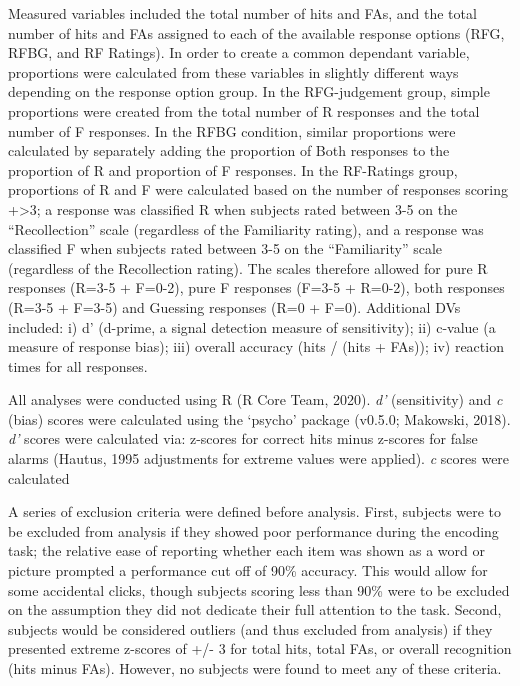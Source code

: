 \documentclass[
  11pt,
]{article}
\begin{document}
Measured variables included the total number of hits and FAs, and the
total number of hits and FAs assigned to each of the available response
options (RFG, RFBG, and RF Ratings). In order to create a common
dependant variable, proportions were calculated from these variables in
slightly different ways depending on the response option group. In the
RFG-judgement group, simple proportions were created from the total
number of R responses and the total number of F responses. In the RFBG
condition, similar proportions were calculated by separately adding the
proportion of Both responses to the proportion of R and proportion of F
responses. In the RF-Ratings group, proportions of R and F were
calculated based on the number of responses scoring +\textgreater3; a
response was classified R when subjects rated between 3-5 on the
``Recollection'' scale (regardless of the Familiarity rating), and a
response was classified F when subjects rated between 3-5 on the
``Familiarity'' scale (regardless of the Recollection rating). The
scales therefore allowed for pure R responses (R=3-5 + F=0-2), pure F
responses (F=3-5 + R=0-2), both responses (R=3-5 + F=3-5) and Guessing
responses (R=0 + F=0). Additional DVs included: i) d' (d-prime, a signal
detection measure of sensitivity); ii) c-value (a measure of response
bias); iii) overall accuracy (hits / (hits + FAs)); iv) reaction times
for all responses.

All analyses were conducted using R (R Core Team, 2020). \emph{d'}
(sensitivity) and \emph{c} (bias) scores were calculated using the
`psycho' package (v0.5.0; Makowski, 2018). \emph{d'} scores were
calculated via: z-scores for correct hits minus z-scores for false
alarms (Hautus, 1995 adjustments for extreme values were applied).
\emph{c} scores were calculated

A series of exclusion criteria were defined before analysis. First,
subjects were to be excluded from analysis if they showed poor
performance during the encoding task; the relative ease of reporting
whether each item was shown as a word or picture prompted a performance
cut off of 90\% accuracy. This would allow for some accidental clicks,
though subjects scoring less than 90\% were to be excluded on the
assumption they did not dedicate their full attention to the task.
Second, subjects would be considered outliers (and thus excluded from
analysis) if they presented extreme z-scores of +/- 3 for total hits,
total FAs, or overall recognition (hits minus FAs). However, no subjects
were found to meet any of these criteria.
\end{document}
